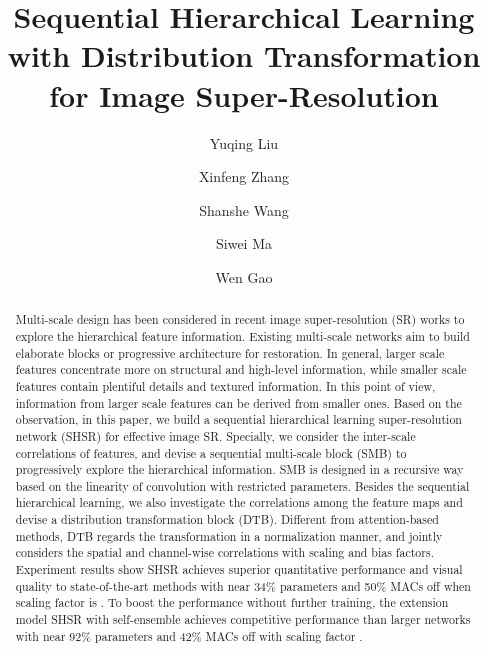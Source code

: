 \documentclass[manuscript,screen]{acmart}
\begin{document}
\title[SHSR]{Sequential Hierarchical Learning with Distribution Transformation for Image Super-Resolution}

\author{Yuqing Liu}

\author{Xinfeng Zhang}

\author{Shanshe Wang}

\author{Siwei Ma}

\author{Wen Gao}






\renewcommand{\shortauthors}{Liu, et al.}

\begin{abstract}
    Multi-scale design has been considered in recent image super-resolution (SR) works to explore the hierarchical feature information. 
    Existing multi-scale networks aim to build elaborate blocks or progressive architecture for restoration.
    In general, larger scale features concentrate more on structural and high-level information, while smaller scale features contain plentiful details and textured information. 
    In this point of view, information from larger scale features can be derived from smaller ones.
Based on the observation, in this paper, we build a sequential hierarchical learning super-resolution network (SHSR) for effective image SR. 
    Specially, we consider the inter-scale correlations of features, and devise a sequential multi-scale block (SMB) to progressively explore the hierarchical information.
    SMB is designed in a recursive way based on the linearity of convolution with restricted parameters.
    Besides the sequential hierarchical learning, we also investigate the correlations among the feature maps and devise a distribution transformation block (DTB).
    Different from attention-based methods, DTB regards the transformation in a normalization manner, and jointly considers the spatial and channel-wise correlations with scaling and bias factors.
    Experiment results show SHSR achieves superior quantitative performance and visual quality to state-of-the-art methods with near 34\% parameters and 50\% MACs off when scaling factor is .
    To boost the performance without further training, the extension model SHSR with self-ensemble achieves competitive performance than larger networks with near 92\% parameters and 42\% MACs off with scaling factor .
\end{abstract}
\end{document}

